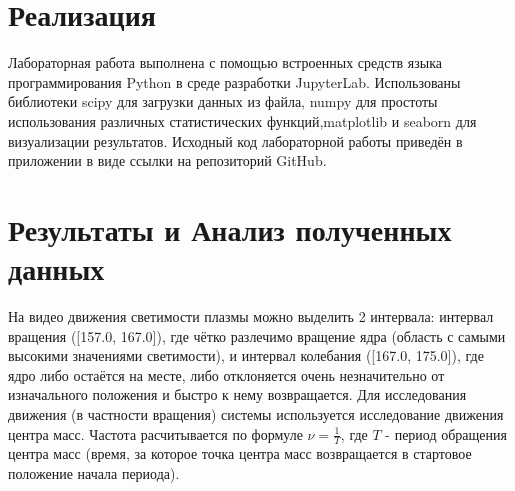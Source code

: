 \documentclass[a4paper,12pt]{article} %
\begin{document}
	\section{Реализация}
	Лабораторная работа выполнена с помощью встроенных средств языка программирования Python в среде разработки JupyterLab. Использованы библиотеки scipy для загрузки данных из файла, numpy для простоты использования различных статистических функций,matplotlib и seaborn для визуализации результатов.
	Исходный код лабораторной работы приведён в приложении в виде ссылки на репозиторий GitHub.
	\section{Результаты и Анализ полученных данных}
	На видео движения светимости плазмы можно выделить 2 интервала: интервал вращения ([157.0, 167.0]), где чётко разлечимо вращение ядра (область с самыми высокими значениями светимости),
	и интервал колебания ([167.0, 175.0]), где ядро либо остаётся на месте, либо отклоняется очень незначительно от изначального положения и быстро к нему возвращается.
	\newline Для исследования движения (в частности вращения) системы используется исследование движения центра масс. Частота расчитывается по формуле $\nu = \frac{1}{T}$, где $T$ - период обращения центра масс (время, за которое точка центра масс возвращается в стартовое положение начала периода).
\end{document}

